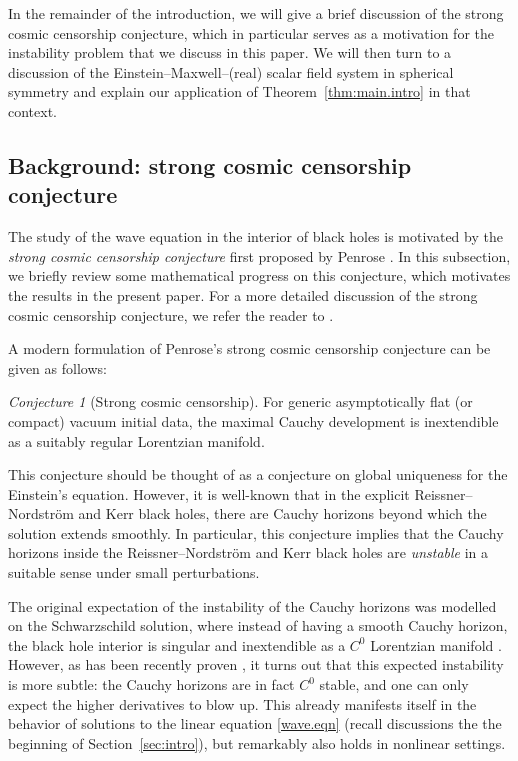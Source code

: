 \documentclass[10pt, reqno]{amsart}
\theoremstyle{definition}
\theoremstyle{remark}
\newtheorem{conjecture}[theorem]{Conjecture}
\numberwithin{equation}{section}
\newcommand{\0}{\emptyset}
\begin{document}
In the remainder of the introduction, we will give a brief discussion of the strong cosmic censorship conjecture, which in particular serves as a motivation for the instability problem that we discuss in this paper. We will then turn to a discussion of the Einstein--Maxwell--(real) scalar field system in spherical symmetry and explain our application of Theorem~\ref{thm:main.intro} in that context.

\subsection{Background: strong cosmic censorship conjecture}\label{sec:SCC}

The study of the wave equation in the interior of black holes is motivated by the \emph{strong cosmic censorship conjecture} first proposed by Penrose \cite{PenroseSCCrefer}. In this subsection, we briefly review some mathematical progress on this conjecture, which motivates the results in the present paper. For a more detailed discussion of the strong cosmic censorship conjecture, we refer the reader to \cite{DL}.

A modern formulation of Penrose's strong cosmic censorship conjecture can be given as follows:
\begin{conjecture}[Strong cosmic censorship]\label{conj:SCC}
For generic asymptotically flat (or compact) vacuum initial data, the maximal Cauchy development is inextendible as a suitably regular Lorentzian manifold.
\end{conjecture}
This conjecture should be thought of as a conjecture on global uniqueness for the Einstein's equation. However, it is well-known that in the explicit Reissner--Nordstr\"om and Kerr black holes, there are Cauchy horizons beyond which the solution extends smoothly. In particular, this conjecture implies that the Cauchy horizons inside the Reissner--Nordstr\"om and Kerr black holes are \emph{unstable} in a suitable sense under small perturbations. 

The original expectation of the instability of the Cauchy horizons was modelled on the Schwarzschild solution, where instead of having a smooth Cauchy horizon, the black hole interior is singular and inextendible as a $C^0$ Lorentzian manifold \cite{Sbie.C0}. However, as has been recently proven \cite{DL}, it turns out that this expected instability is more subtle: the Cauchy horizons are in fact $C^0$ stable, and one can only expect the higher derivatives to blow up. This already manifests itself in the behavior of solutions to the linear equation \eqref{wave.eqn} (recall discussions the the beginning of Section~\ref{sec:intro}), but remarkably also holds in nonlinear settings.
\end{document}
